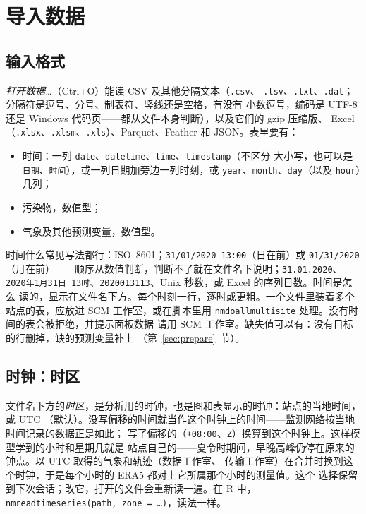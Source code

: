 \documentclass[11pt]{ctexrep}
\newcommand{\nosep}{\setlength{\itemsep}{0pt}\setlength{\parskip}{0pt}\setlength{\topsep}{2pt}}
\newcommand{\codeunderscore}{\textunderscore\allowbreak}
\newcommand{\code}[1]{\texttt{\let\_\codeunderscore #1}}
\begin{document}
\chapter{导入数据}\label{ch:data}

\section{输入格式}\label{sec:input}
\emph{打开数据…}（Ctrl+O）能读 CSV 及其他分隔文本（\code{.csv}、
\code{.tsv}、\code{.txt}、\code{.dat}；分隔符是逗号、分号、制表符、竖线还是空格，有没有
小数逗号，编码是 UTF-8 还是 Windows 代码页——都从文件本身判断），以及它们的 gzip 压缩版、
Excel（\code{.xlsx}、\code{.xlsm}、\code{.xls}）、Parquet、Feather 和 JSON。表里要有：
\begin{itemize}\nosep
  \item 时间：一列 \code{date}、\code{datetime}、\code{time}、\code{timestamp}（不区分
        大小写，也可以是\code{日期}、\code{时间}），或一列日期加旁边一列时刻，或
        \code{year}、\code{month}、\code{day}（以及 \code{hour}）几列；
  \item 污染物，数值型；
  \item 气象及其他预测变量，数值型。
\end{itemize}
时间什么常见写法都行：ISO~8601；\code{31/01/2020 13:00}（日在前）或 \code{01/31/2020}
（月在前）——顺序从数值判断，判断不了就在文件名下说明；\code{31.01.2020}、
\code{2020年1月31日 13时}、\code{2020013113}、Unix 秒数，或 Excel 的序列日数。时间是怎么
读的，显示在文件名下方。每个时刻一行，逐时或更粗。一个文件里装着多个站点的表，应放进 SCM
工作室，或在脚本里用 \code{nm\_do\_all\_multisite} 处理。没有时间的表会被拒绝，并提示面板数据
请用 SCM 工作室。缺失值可以有：没有目标的行删掉，缺的预测变量补上
（第~\ref{sec:prepare}~节）。

\section{时钟：时区}\label{sec:clock}
文件名下方的\emph{时区}，是分析用的时钟，也是图和表显示的时钟：站点的当地时间，或 UTC
（默认）。没写偏移的时间就当作这个时钟上的时间——监测网络按当地时间记录的数据正是如此；
写了偏移的（\code{+08:00}、\code{Z}）换算到这个时钟上。这样模型学到的小时和星期几就是
站点自己的——夏令时期间，早晚高峰仍停在原来的钟点。以 UTC 取得的气象和轨迹（数据工作室、
传输工作室）在合并时换到这个时钟，于是每个小时的 ERA5 都对上它所属那个小时的测量值。这个
选择保留到下次会话；改它，打开的文件会重新读一遍。在 R 中，
\code{nm\_read\_time\_series(path, zone = \ldots)}，读法一样。
\end{document}
